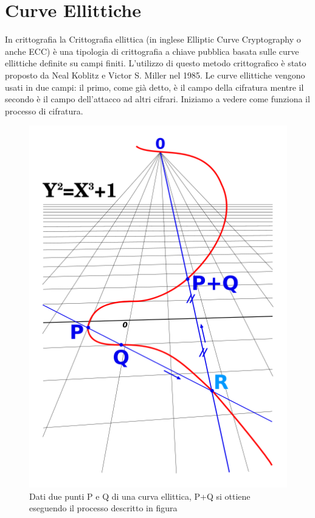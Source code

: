 \documentclass[10pt,a4paper]{article}
\begin{document}
\section{Curve Ellittiche}
In crittografia la Crittografia ellittica (in inglese Elliptic Curve Cryptography o anche ECC) è una tipologia di crittografia a chiave pubblica basata sulle curve ellittiche definite su campi finiti. L'utilizzo di questo metodo crittografico è stato proposto da Neal Koblitz e Victor S. Miller nel 1985. Le curve ellittiche vengono usati in due campi: il primo, come già detto, è il campo della cifratura mentre il secondo è il campo dell'attacco ad altri cifrari. Iniziamo a vedere come funziona il processo di cifratura.

\begin{figure}[htbp]
\includegraphics[scale=0.4]{immagini/curva_ellitica.png}
\caption{Dati due punti P e Q di una curva ellittica, P+Q si ottiene eseguendo il processo descritto in figura}
\end{figure}
\end{document}
